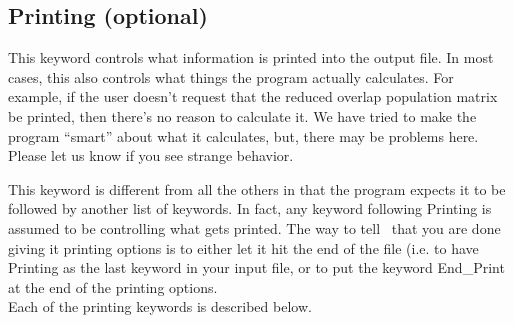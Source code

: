 \subsection{{\sf Printing} (optional)}

This keyword controls what information is printed into the output
file.  In most cases, this also controls what things the program
actually calculates.  For example, if the user doesn't request that
the reduced overlap population matrix be printed, then there's no
reason to calculate it.  We have tried to make the program
``smart'' about what it calculates, but, there
may be problems here.  Please let us know if you see strange behavior.

This keyword is different from all the others in that the program
expects it to be followed by another list of keywords.  In fact, any
keyword following {\sf Printing} is assumed to be controlling what
gets printed.  The way to tell \calcprog\ that you are done giving it
printing options is to either let it hit the end of the file (i.e. to
have {\sf Printing} as the last keyword in your input file, or to put
the keyword {\sf End\_Print} at the end of the printing options. \\

\noindent Each of the printing keywords is described below.

